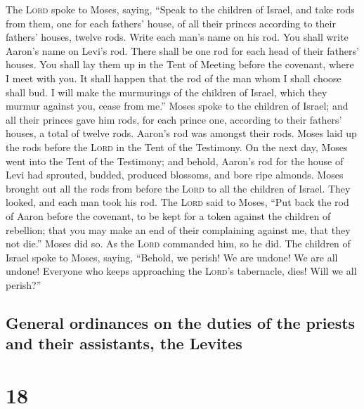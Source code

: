  The \textsc{Lord} spoke to Moses, saying, 
``Speak to the children of Israel, and take rods from them, one for each
fathers' house, of all their princes according to their fathers' houses,
twelve rods. Write each man's name on his rod.  You shall
write Aaron's name on Levi's rod. There shall be one rod for each head
of their fathers' houses.  You shall lay them up in the
Tent of Meeting before the covenant, where I meet with you.
 It shall happen that the rod of the man whom I shall
choose shall bud. I will make the murmurings of the children of Israel,
which they murmur against you, cease from me.''  Moses
spoke to the children of Israel; and all their princes gave him rods,
for each prince one, according to their fathers' houses, a total of
twelve rods. Aaron's rod was amongst their rods.  Moses
laid up the rods before the \textsc{Lord} in the Tent of the Testimony.
 On the next day, Moses went into the Tent of the
Testimony; and behold, Aaron's rod for the house of Levi had sprouted,
budded, produced blossoms, and bore ripe almonds.  Moses
brought out all the rods from before the \textsc{Lord} to all the
children of Israel. They looked, and each man took his rod.
 The \textsc{Lord} said to Moses, ``Put back the rod of
Aaron before the covenant, to be kept for a token against the children
of rebellion; that you may make an end of their complaining against me,
that they not die.''  Moses did so. As the \textsc{Lord}
commanded him, so he did.  The children of Israel spoke
to Moses, saying, ``Behold, we perish! We are undone! We are all undone!
 Everyone who keeps approaching the \textsc{Lord}'s
tabernacle, dies! Will we all perish?''

\hypertarget{general-ordinances-on-the-duties-of-the-priests-and-their-assistants-the-levites}{%
\subsection{General ordinances on the duties of the priests and their
assistants, the
Levites}\label{general-ordinances-on-the-duties-of-the-priests-and-their-assistants-the-levites}}

\hypertarget{section-17}{%
\section{18}\label{section-17}}

